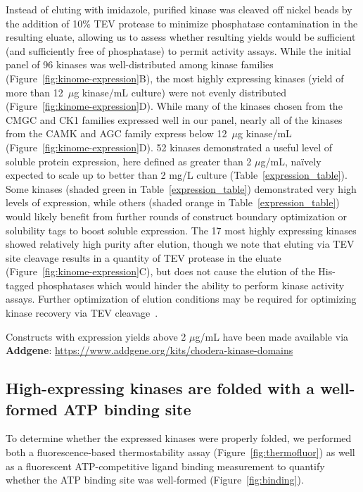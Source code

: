 \documentclass[phd,tocprelim]{cornell}
\begin{document}
Instead of eluting with imidazole, purified kinase was cleaved off nickel beads by the addition of 10\% TEV protease to minimize phosphatase contamination in the resulting eluate, allowing us to assess whether resulting yields would be sufficient (and sufficiently free of phosphatase) to permit activity assays.
While the initial panel of 96 kinases was well-distributed among kinase families (Figure~\ref{fig:kinome-expression}B), the most highly expressing kinases (yield of more than 12~$\mu$g kinase/mL culture) were not evenly distributed (Figure~\ref{fig:kinome-expression}D). While many of the kinases chosen from the CMGC and CK1 families expressed well in our panel, nearly all of the kinases from the CAMK and AGC family express below 12~$\mu$g kinase/mL (Figure~\ref{fig:kinome-expression}D).   
52 kinases demonstrated a useful level of soluble protein expression, here defined as greater than 2 $\mu$g/mL, na\"{i}vely expected to scale up to better than 2 mg/L culture (Table~\ref{expression_table}). 
Some kinases (shaded green in Table~\ref{expression_table}) demonstrated very high levels of expression, while others (shaded orange in Table~\ref{expression_table}) would likely benefit from further rounds of construct boundary optimization or solubility tags to boost soluble expression. 
The 17 most highly expressing kinases showed relatively high purity after elution, though we note that eluting via TEV site cleavage results in a quantity of TEV protease in the eluate (Figure~\ref{fig:kinome-expression}C), but does not cause the elution of the His-tagged phosphatases which would hinder the ability to perform kinase activity assays. 
Further optimization of elution conditions may be required for optimizing kinase recovery via TEV cleavage~\citep{Puhl:2009gg,Nallamsetty:2004cp,Sun:2012bh}.

Constructs with expression yields above 2 $\mu$g/mL have been made available via {\bf Addgene}:
\url{https://www.addgene.org/kits/chodera-kinase-domains}

\subsection{High-expressing kinases are folded with a well-formed ATP binding site}

To determine whether the expressed kinases were properly folded, we performed both a fluorescence-based thermostability assay (Figure~\ref{fig:thermofluor}) as well as a fluorescent ATP-competitive ligand binding measurement to quantify whether the ATP binding site was well-formed (Figure~\ref{fig:binding}). 
\end{document}
